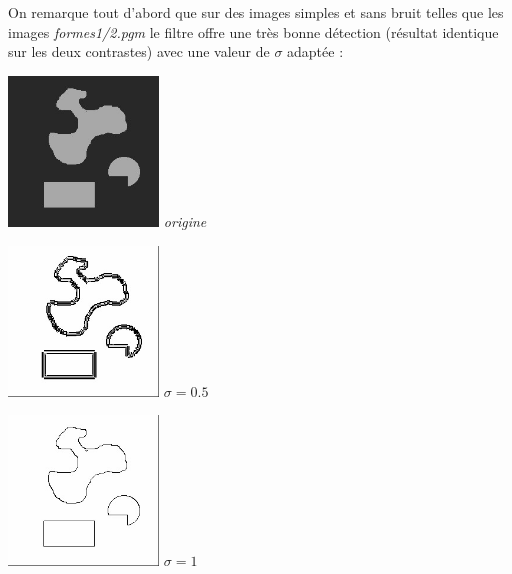 \documentclass[a4,12pt]{article}
\begin{document}
On remarque tout d'abord que sur des images simples et sans bruit telles que les images \textit{formes1/2.pgm} le filtre offre une très bonne détection (résultat identique sur les deux contrastes) avec une valeur de $\sigma$ adaptée :\\

\noindent
\begin{center}
	\begin{minipage}[c]{0.24\linewidth}
		\begin{center}
			\includegraphics[width = 40mm]{./img/1.jpg}
			\textit{origine}
		\end{center}
	\end{minipage}
	\begin{minipage}[c]{0.24\linewidth}
		\begin{center}
			\includegraphics[width = 40mm]{./img/ctrformes1-0_5.jpg}
			\textit{$\sigma = 0.5$}\
		\end{center}
	\end{minipage}
	\begin{minipage}[c]{0.24\linewidth}
		\begin{center}
			\includegraphics[width = 40mm]{./img/ctrformes1-1.jpg}
			\textit{$\sigma = 1$}
		\end{center}
	\end{minipage}

\end{center}
\end{document}

